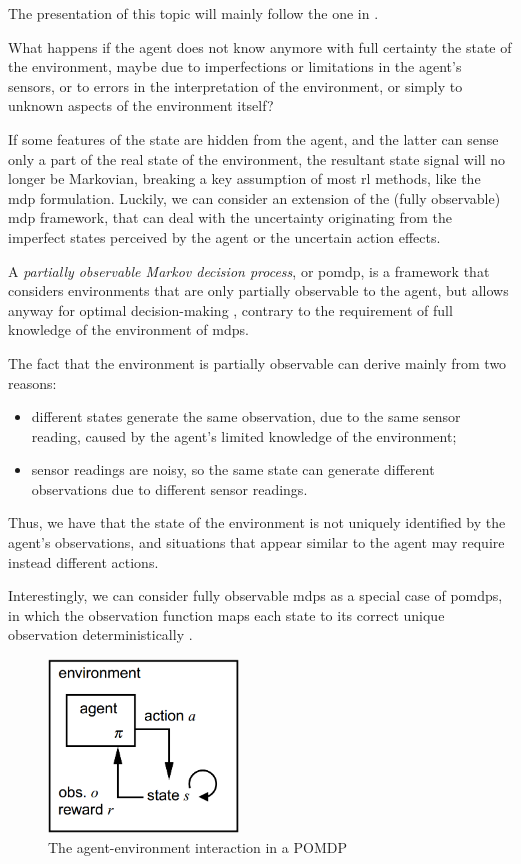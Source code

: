 The presentation of this topic will mainly follow the one in \cite{Spaan12pomdp}.

What happens if the agent does not know anymore with full certainty the state of the environment, maybe due to imperfections or limitations in the agent's sensors, or to errors in the interpretation of the environment, or simply to unknown aspects of the environment itself?

If some features of the state are hidden from the agent, and the latter can sense only a part of the real state of the environment, the resultant state signal will no longer be Markovian, breaking a key assumption of most \acrshort{rl} methods, like the \acrshort{mdp} formulation. Luckily, we can consider an extension of the (fully observable) \acrshort{mdp} framework, that can deal with the uncertainty originating from the imperfect states perceived by the agent or the uncertain action effects.

A \emph{partially observable Markov decision process}, or \acrshort{pomdp}, is a framework that considers environments that are only partially observable to the agent, but allows anyway for optimal decision-making \cite{Kaelbling1998}, contrary to the requirement of full knowledge of the environment of \acrshort{mdp}s.

The fact that the environment is partially observable can derive mainly from two reasons:
\begin{itemize}
    \item different states generate the same observation, due to the same sensor reading, caused by the agent's limited knowledge of the environment;
    \item sensor readings are noisy, so the same state can generate different observations due to different sensor readings.
\end{itemize}
Thus, we have that the state of the environment is not uniquely identified by the agent's observations, and situations that appear similar to the agent may require instead different actions.

Interestingly, we can consider fully observable \acrshort{mdp}s as a special case of \acrshort{pomdp}s, in which the observation function maps each state to its correct unique observation deterministically \cite{Poupart2010}.

\begin{figure}[ht]
    \centering
    \includegraphics[width=0.45\textwidth]{chapters/figures/POMDP-schema.png}
    \caption{The agent-environment interaction in a POMDP \cite{Spaan12pomdp}}
    \label{fig:POMDP}
\end{figure}

